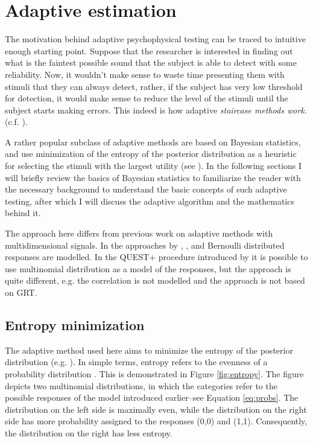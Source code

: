 \documentclass{article}\usepackage{knitr}
\begin{document}
\newpage


\section{Adaptive estimation}

The motivation behind adaptive psychophysical testing can be traced to intuitive enough starting point. Suppose that the researcher is interested in finding out what is the faintest possible sound that the subject is able to detect with some reliability. Now, it wouldn't make sense to waste time presenting them with stimuli that they can always detect, rather, if the subject has very low threshold for detection, it would make sense to reduce the level of the stimuli until the subject starts making errors. This indeed is how adaptive \textit{staircase methods work}. (c.f. \citet[Chapter 5]{kingdomprins2010}).

A rather popular subclass of adaptive methods are based on Bayesian statistics, and use minimization of the entropy of the posterior distribution as a heuristic for selecting the stimuli with the largest utility (see \citet{kontsevichtyler1999}). In the following sections I will briefly review the basics of Bayesian statistics to familiarize the reader with the necessary background to understand the basic concepts of such adaptive testing, after which I will discuss the adaptive algorithm and the mathematics behind it.

The approach here differs from previous work on adaptive methods with multidimensional signals. In the approaches by \citet{dimattina2015}, \citet{lesmes2006}, \citet{shen2013, shen2014} and \citet{kujalalukka2006} Bernoulli distributed responses are modelled. In the QUEST+ procedure introduced by \citet{watson2017} it is possible to use multinomial distribution as a model of the responses, but the approach is quite different, e.g. the correlation is not modelled and the approach is not based on GRT.

\subsection{Entropy minimization}

The adaptive method used here aims to minimize the entropy of the posterior distribution (e.g. \citet{kontsevichtyler1999, kujalalukka2006, lesmes2015}). In simple terms, entropy refers to the evenness of a probability distribution \citep[p. 365]{kruschke2015}. This is demonstrated in Figure \ref{fig:entropy}. The figure depicts two multinomial distributions, in which the categories refer to the possible responses of the model introduced earlier--see Equation \ref{eq:probs}. The distribution on the left side is maximally even, while the distribution on the right side has more probability assigned to the responses (0,0) and (1,1). Consequently, the distribution on the right has less entropy.
\end{document}
